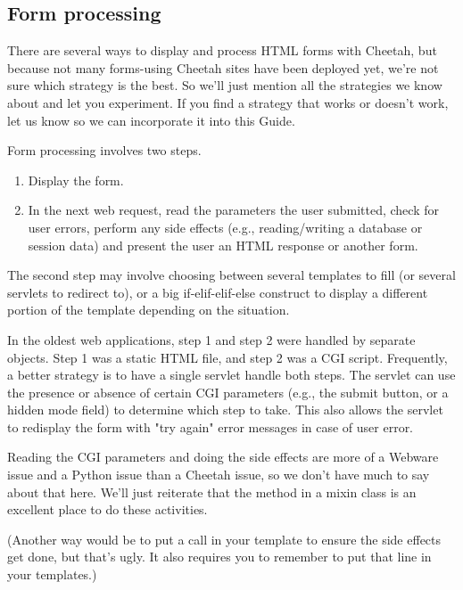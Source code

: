\subsection{Form processing}
\label{webware.form}

There are several ways to display and process HTML forms with Cheetah, but 
because not many forms-using Cheetah sites have been deployed yet, we're not
sure which strategy is the best.  So we'll just mention all the strategies we
know about and let you experiment.  If you find a strategy that works or doesn't
work, let us know so we can incorporate it into this Guide.

Form processing involves two steps.  
\begin{enumerate}
\item{} Display the form.  
\item{} In the next web request, read the parameters the user submitted,
check for user errors, perform any side effects (e.g., reading/writing a
database or session data) and present the user an HTML response or another
form.  
\end{enumerate}

The second step may involve choosing between several templates to fill (or
several servlets to redirect to), or a big if-elif-elif-else construct to
display a different portion of the template depending on the situation.

In the oldest web applications, step 1 and step 2 were handled by separate
objects.  Step 1 was a static HTML file, and step 2 was a CGI script.
Frequently, a better strategy is to have a single servlet handle both steps.
The servlet can use the presence or absence of certain CGI parameters
(e.g., the submit button, or a hidden mode field) to determine which step to
take.  This also allows the servlet to redisplay the form with "try again"
error messages in case of user error.  

Reading the CGI parameters and doing the side effects are more of a Webware 
issue and a Python issue than a Cheetah issue, so we don't have much to say
about that here.  We'll just reiterate that the  method in a
mixin class is an excellent place to do these activities.  

(Another way would be to put a  call in your
template to ensure the side effects get done, but that's ugly.  It also
requires you to remember to put that line in your templates.)

